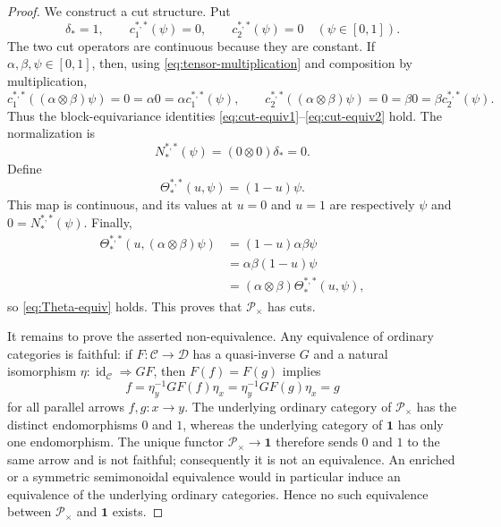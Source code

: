 \documentclass[12pt,a4paper]{amsart}
\newcommand{\Pcat}{\mathcal P}
\newcommand{\One}{\mathbf 1}
\newcommand{\id}{\operatorname{id}}
\newcommand{\Pmult}{\Pcat_{\times}}
\theoremstyle{definition}
\begin{document}
\begin{proof}
	We construct a cut structure.  Put
	\[
	\delta_*=1,
	\qquad c^{*,*}_1(\psi)=0,
	\qquad c^{*,*}_2(\psi)=0
	\quad(\psi\in[0,1]).
	\]
	The two cut operators are continuous because they are constant.  If \(\alpha,\beta,\psi\in[0,1]\), then, using \eqref{eq:tensor-multiplication} and composition by multiplication,
	\[
	c^{*,*}_1((\alpha\otimes\beta)\psi)=0
	=\alpha 0=\alpha c^{*,*}_1(\psi),
	\qquad
	c^{*,*}_2((\alpha\otimes\beta)\psi)=0
	=\beta 0=\beta c^{*,*}_2(\psi).
	\]
	Thus the block-equivariance identities \eqref{eq:cut-equiv1}--\eqref{eq:cut-equiv2} hold.  The normalization is
	\[
	N^{*,*}_*(\psi)=(0\otimes0)\delta_*=0.
	\]
	Define
	\begin{equation}\label{eq:theta-example}
		\Theta^{*,*}_*(u,\psi)=(1-u)\psi.
	\end{equation}
	This map is continuous, and its values at \(u=0\) and \(u=1\) are respectively \(\psi\) and \(0=N^{*,*}_*(\psi)\).  Finally,
	\begin{align*}
		\Theta^{*,*}_*(u,(\alpha\otimes\beta)\psi)
		&=(1-u)\alpha\beta\psi \\
		&=\alpha\beta(1-u)\psi \\
		&=(\alpha\otimes\beta)\Theta^{*,*}_*(u,\psi),
	\end{align*}
	so \eqref{eq:Theta-equiv} holds.  This proves that \(\Pmult\) has cuts.
	
	It remains to prove the asserted non-equivalence.  Any equivalence of ordinary categories is faithful: if \(F:\mathcal C\to\mathcal D\) has a quasi-inverse \(G\) and a natural isomorphism \(\eta:\id_{\mathcal C}\Rightarrow GF\), then \(F(f)=F(g)\) implies
	\[
	f=\eta_y^{-1}GF(f)\eta_x
	=\eta_y^{-1}GF(g)\eta_x=g
	\]
	for all parallel arrows \(f,g: x\to y\).  The underlying ordinary category of \(\Pmult\) has the distinct endomorphisms \(0\) and \(1\), whereas the underlying category of \(\One\) has only one endomorphism.  The unique functor \(\Pmult\to\One\) therefore sends \(0\) and \(1\) to the same arrow and is not faithful; consequently it is not an equivalence.  An enriched or a symmetric semimonoidal equivalence would in particular induce an equivalence of the underlying ordinary categories.  Hence no such equivalence between \(\Pmult\) and \(\One\) exists.
\end{proof}
\end{document}
